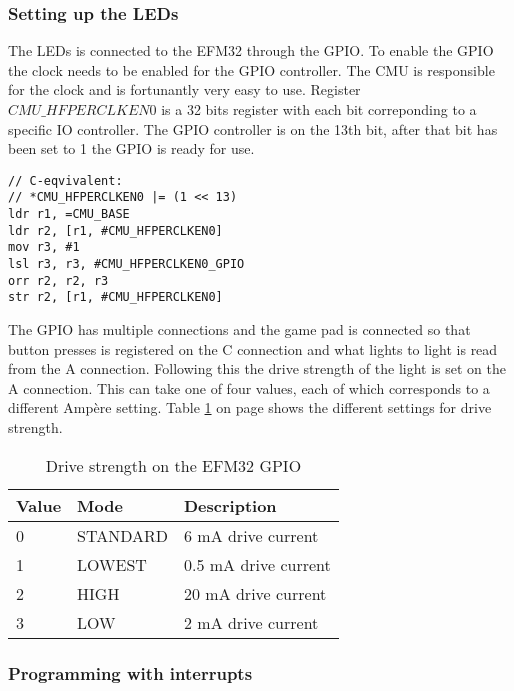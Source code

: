\subsubsection{Setting up the LEDs}
\label{subsubsec:dev_pros_setup_led}

The LEDs is connected to the EFM32 through the GPIO. To enable the GPIO the clock needs to be enabled for the GPIO controller. The CMU is responsible for the clock and is fortunantly very easy to use. Register $CMU\_HFPERCLKEN0$ is a 32 bits register with each bit correponding to a specific IO controller. The GPIO controller is on the 13th bit, after that bit has been set to 1 the GPIO is ready for use.

\begin{lstlisting}
// C-eqvivalent:
// *CMU_HFPERCLKEN0 |= (1 << 13)
ldr r1, =CMU_BASE
ldr r2, [r1, #CMU_HFPERCLKEN0]
mov r3, #1
lsl r3, r3, #CMU_HFPERCLKEN0_GPIO
orr r2, r2, r3
str r2, [r1, #CMU_HFPERCLKEN0]
\end{lstlisting}

The GPIO has multiple connections and the game pad is connected so that button presses is registered on the C connection and what lights to light is read from the A connection. Following this the drive strength of the light is set on the A connection. This can take one of four values, each of which corresponds to a different Ampère setting. Table \ref{tab:drive_strength} on page \pageref{tab:drive_strength} shows the different settings for drive strength.

\begin{table}
    \begin{center}
    \begin{tabular}{| l | l | l |}
        \hline
        Value   & Mode      & Description \\
        \hline
        0       & STANDARD  & 6 mA drive current \\
        \hline
        1       & LOWEST    & 0.5 mA drive current \\
        \hline
        2       & HIGH      & 20 mA drive current \\
        \hline
        3       & LOW       & 2 mA drive current \\
        \hline
    \end{tabular}
    \caption{Drive strength on the EFM32 GPIO}
    \label{tab:drive_strength}
    \end{center}
\end{table}

\subsubsection{Programming with interrupts}
\label{subsubsec:dev_pros_interrupts}

